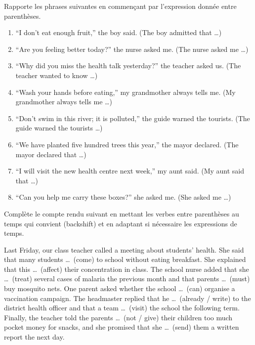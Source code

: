 \documentclass[11pt]{article}
\begin{document}
\begin{exercice}
Rapporte les phrases suivantes en commençant par l'expression donnée entre parenthèses.
\begin{enumerate}
\item “I don't eat enough fruit,” the boy said. (The boy admitted that \ldots)
\item “Are you feeling better today?” the nurse asked me. (The nurse asked me \ldots)
\item “Why did you miss the health talk yesterday?” the teacher asked us. (The teacher wanted to know \ldots)
\item “Wash your hands before eating,” my grandmother always tells me. (My grandmother always tells me \ldots)
\item “Don't swim in this river; it is polluted,” the guide warned the tourists. (The guide warned the tourists \ldots)
\item “We have planted five hundred trees this year,” the mayor declared. (The mayor declared that \ldots)
\item “I will visit the new health centre next week,” my aunt said. (My aunt said that \ldots)
\item “Can you help me carry these boxes?” she asked me. (She asked me \ldots)
\end{enumerate}
\end{exercice}

\begin{exercice}
Complète le compte rendu suivant en mettant les verbes entre parenthèses au temps qui convient (backshift) et en adaptant si nécessaire les expressions de temps.

\begin{textebox}
Last Friday, our class teacher called a meeting about students' health. She said that many students \ldots\ (come) to school without eating breakfast. She explained that this \ldots\ (affect) their concentration in class. The school nurse added that she \ldots\ (treat) several cases of malaria the previous month and that parents \ldots\ (must) buy mosquito nets. One parent asked whether the school \ldots\ (can) organise a vaccination campaign. The headmaster replied that he \ldots\ (already / write) to the district health officer and that a team \ldots\ (visit) the school the following term. Finally, the teacher told the parents \ldots\ (not / give) their children too much pocket money for snacks, and she promised that she \ldots\ (send) them a written report the next day.
\end{textebox}
\end{exercice}
\end{document}
